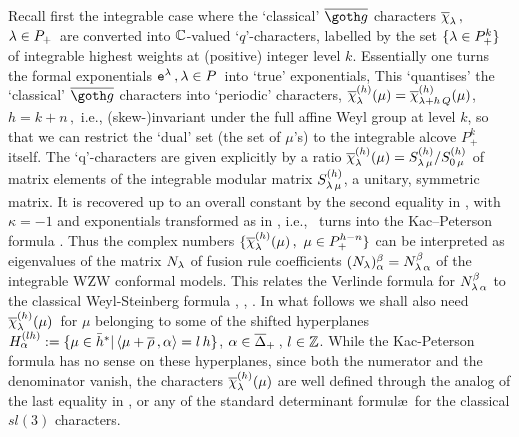 Recall first the integrable case where the
`classical' $\bgo$  characters $\overline{\chi}_{\lambda}\,, $ $\lambda\in P_+\,$ are
converted into $\Bbb C$-valued `$q$'-characters, labelled by the
set   $\{\lambda\in P_+^{k}\}$ of integrable highest weights at
(positive) integer level $k$.  Essentially one turns the formal
exponentials ${\tt e}^{\lambda}\,, \lambda\in P\,$ into `true'
exponentials,
%
\eqn{}
%
 This `quantises' the  `classical' $\bgo$ characters into
`periodic' 
characters, $\overline{\chi}_{\lambda}^{(h)}(\mu)=\overline{\chi}_{\lambda+
h\, Q}^{(h)}(\mu)$, $h=k+n\,,$
 i.e., (skew-)invariant  under the full
affine Weyl group at level $k$, 
%
\eqn{}
%
so that we can restrict the `dual'  set
(the set of $\mu$'s) to the integrable 
alcove $ P_+^{k}$
itself. 
The `q'-characters  are given explicitly by a ratio
$\overline{\chi}_{\lambda}^{(h)}(\mu)=S_{\lambda\,\mu}^{(h)}/S_{0\,\mu}^{(h)}$ of
matrix elements of the integrable modular matrix
$S_{\lambda\,\mu}^{(h)}$, a unitary, symmetric matrix. It is recovered
up to an overall constant by the second equality in \sfch, with
$\kappa=-1$ and exponentials transformed as in \Vc, i.e., \sfch\
turns into  the Kac--Peterson formula \K.  Thus the complex  numbers
$\{\overline{\chi}_{\lambda}^{(h)}(\mu)\,, \ \mu\in P_+^{h-n}\}$ can be
interpreted as eigenvalues of the matrix $N_{\lambda}$ of fusion rule
coefficients $(N_{\lambda})_{\alpha}^{\beta}=N_{\lambda\,\alpha}^{\beta}$ of the
integrable WZW conformal models. This relates the Verlinde
formula for $N_{\lambda\,\alpha}^{\beta}$ to the classical Weyl-Steinberg
formula \K, \MW, \FGPa. In what follows we shall also need
$\overline{\chi}_{\lambda}^{(h)}(\mu)\,$ for $\mu$ belonging to some of the
shifted hyperplanes $H_{\alpha}^{(l h)}:=\{\mu\in \bar{h}^{*} |\,
\langle\mu+\overline{\rho}\,,\alpha\rangle=l\,h \}$, $\alpha\in \overline\Delta_+\,$, $ l\in \Bbb Z$.
While the Kac-Peterson formula has no sense on these hyperplanes,
since both the numerator and the denominator vanish, the
characters $\overline{\chi}_{\lambda}^{(h)}(\mu)$ are well defined through the
analog of the last equality in \sfch, or any of the standard
determinant formul\ae\ for the classical $sl(3)$ characters.

